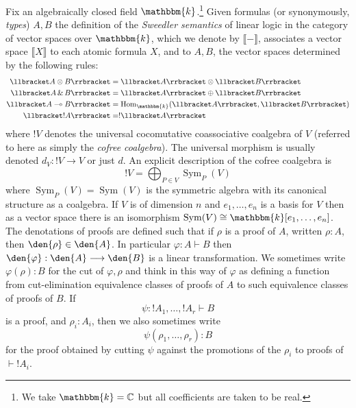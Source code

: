 \documentclass[english,letter paper,12pt,reqno]{article}
\theoremstyle{definition}
\def\be{\begin{equation}}
\def\ee{\end{equation}}
\newcommand{\lto}{\longrightarrow}
\begin{document}
Fix an algebraically closed field $\mathbbm{k}$.\footnote{We take $\mathbbm{k} = \mathbb{C}$ but all coefficients are taken to be real.} Given formulas (or synonymously, \emph{types}) $A,B$ the definition of the \emph{Sweedler semantics} \cite{murfet2014logic, murfet2015sweedler, CliftMastersThesis} of linear logic in the category of vector spaces over $\mathbbm{k}$, which we denote by $\llbracket - \rrbracket$, associates a vector space $\llbracket X \rrbracket$ to each atomic formula $X$, and to $A,B$, the vector spaces determined by the following rules:
\begin{align*}
    \llbracket A \otimes B \rrbracket &= \llbracket A \rrbracket \otimes \llbracket B \rrbracket\\
    \llbracket A \, \& \, B\rrbracket &= \llbracket A \rrbracket \oplus \llbracket B \rrbracket\\
    \llbracket A \multimap B \rrbracket &= \operatorname{Hom}_{\mathbbm{k}}(\llbracket A \rrbracket, \llbracket B \rrbracket)\\
    \llbracket !A \rrbracket &= !\llbracket A \rrbracket
\end{align*}
where $!V$ denotes the universal cocomutative coassociative coalgebra of $V$ (referred to here as simply the \emph{cofree coalgebra}). The universal morphism is usually denoted $d_V: !V \lto V$ or just $d$. An explicit description of the cofree coalgebra is \cite{murfet2015sweedler}
\begin{equation}
    !V = \bigoplus_{P \in V}\operatorname{Sym}_P(V)
\end{equation}
where $\operatorname{Sym}_P(V) = \operatorname{Sym}(V)$ is the symmetric algebra with its canonical structure as a coalgebra. If $V$ is of dimension $n$ and $e_1, \ldots, e_n$ is a basis for $V$ then as a vector space there is an isomorphism $\operatorname{Sym}(V) \cong \mathbbm{k}[e_1, \ldots, e_n]$. The denotations of proofs are defined such that if $\rho$ is a proof of $A$, written $\rho : A$, then $\den{\rho} \in \den{A}$. In particular $\varphi: A \vdash B$ then $\den{\varphi}: \den{A} \lto \den{B}$ is a linear transformation. We sometimes write $\varphi(\rho) : B$ for the cut of $\varphi, \rho$ and think in this way of $\varphi$ as defining a function from cut-elimination equivalence classes of proofs of $A$ to such equivalence classes of proofs of $B$. If
\[
\psi: {!} A_1, \ldots, {!} A_r \vdash B
\]
is a proof, and $\rho_i : A_i$, then we also sometimes write
\be\label{eq:eval_proof}
\psi(\rho_1,\ldots,\rho_r) : B
\ee
for the proof obtained by cutting $\psi$ against the promotions of the $\rho_i$ to proofs of $\vdash {!} A_i$.
\end{document}
